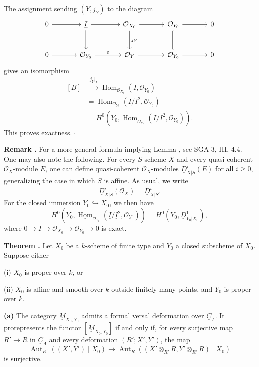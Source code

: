 The assignment sending $(Y,j_Y)$ to the diagram
\[
\begin{tikzcd}[column sep=large,row sep=large]
0 \arrow[r]
& \underline I \arrow[r] \arrow[d]
& \mathcal O_{X_0} \arrow[r] \arrow[d,"j_Y"]
& \mathcal O_{Y_0} \arrow[r] \arrow[d,equal]
& 0 \\
0 \arrow[r]
& \mathcal O_{Y_0} \arrow[r,"\varepsilon"]
& \mathcal O_Y \arrow[r]
& \mathcal O_{Y_0} \arrow[r]
& 0
\end{tikzcd}
\]
gives an isomorphism
\[
\begin{aligned}
[\underline B]
&\xrightarrow{\ j_Y|_{\underline I}\ }
\operatorname{Hom}_{\mathcal O_{X_0}}
 (\underline I,\mathcal O_{Y_0}) \\
&=
\operatorname{Hom}_{\mathcal O_{Y_0}}
 (\underline I/\underline I^2,\mathcal O_{Y_0}) \\
&=
H^0\!\left(
Y_0,
\underline{\operatorname{Hom}}_{\mathcal O_{Y_0}}
(\underline I/\underline I^2,\mathcal O_{Y_0})
\right).
\end{aligned}
\]
This proves exactness. \hfill$\square$


\medskip
\noindent\textbf{Remark .}
For a more general formula implying Lemma , see SGA 3, III, 4.4.
One may also note the following. For every $S$-scheme $X$ and every
quasi-coherent $\mathcal O_X$-module $E$, one can define
quasi-coherent $\mathcal O_X$-modules $\underline D^i_{X|S}(E)$ for
all $i\geq0$, generalizing the case in which $S$ is affine. As usual,
we write
\[
\underline D^i_{X|S}(\mathcal O_X)=\underline D^i_{X|S}.
\]
For the closed immersion $Y_0\hookrightarrow X_0$, we then have
\[
H^0\!\left(
Y_0,
\underline{\operatorname{Hom}}_{\mathcal O_{Y_0}}
(\underline I/\underline I^2,\mathcal O_{Y_0})
\right)
=H^0(Y_0,\underline D^1_{Y_0|X_0}),
\]
where
$0\longrightarrow\underline I\longrightarrow\mathcal O_{X_0}
\longrightarrow\mathcal O_{Y_0}\longrightarrow0$ is exact.

\medskip
\noindent\textbf{Theorem .}
Let $X_0$ be a $k$-scheme of finite type and $Y_0$ a closed
subscheme of $X_0$. Suppose either

\smallskip
\noindent(i) $X_0$ is proper over $k$, or

\noindent(ii) $X_0$ is affine and smooth over $k$ outside finitely
many points, and $Y_0$ is proper over $k$.

\smallskip
\noindent\textbf{(a)}
The category $\underline M_{X_0,Y_0}$ admits a formal versal
deformation over $\underline C_\Lambda$. It prorepresents the functor
$[\underline M_{X_0,Y_0}]$ if and only if, for every surjective map
$R'\longrightarrow R$ in $\underline C_\Lambda$ and every deformation
$(R';X',Y')$, the map
\[
\operatorname{Aut}_{R'}((X',Y')\mid X_0)
\longrightarrow
\operatorname{Aut}_{R}\!\left(
(X'\otimes_{R'}R,Y'\otimes_{R'}R)\mid X_0
\right)
\]
is surjective.

